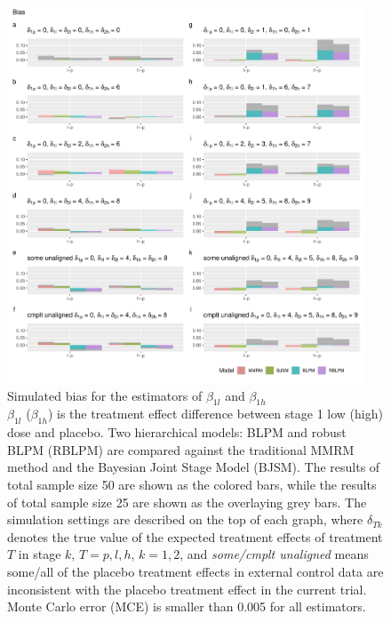 \begin{figure}
\includegraphics[width=0.95\textwidth]{chapters/figures/Bias_longitudinal.pdf}
\caption{Simulated bias for the estimators of $\beta_{1l}$ and $\beta_{1h}$\\$\beta_{1l}$ ($\beta_{1h}$) is the treatment effect difference between stage 1 low (high) dose and placebo. Two hierarchical models: BLPM and robust BLPM (RBLPM) are compared against the traditional MMRM method and the Bayesian Joint Stage Model (BJSM). The results of total sample size 50 are shown as the colored bars, while the results of total sample size 25 are shown as the overlaying grey bars. The simulation settings are described on the top of each graph, where $\delta_{Tk}$ denotes the true value of the expected treatment effects of treatment $T$ in stage $k$, $T = p, l, h$, $k = 1, 2$, and \emph{some/cmplt unaligned} means some/all of the placebo treatment effects in external control data are inconsistent with the placebo treatment effect in the current trial. Monte Carlo error (MCE) is smaller than 0.005 for all estimators.}
\label{fig:Bias_longitudinal}
\end{figure}


